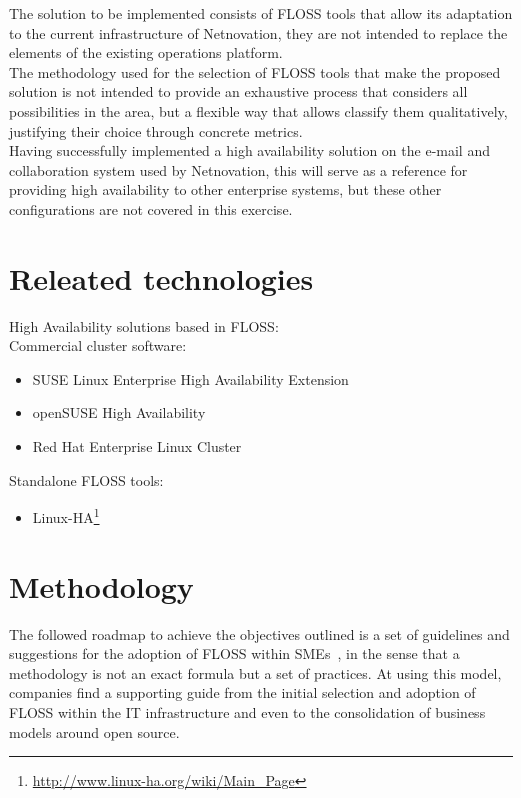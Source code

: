 \documentclass[a4paper, 12pt]{book}
\begin{document}
The solution to be implemented consists of FLOSS tools that allow its adaptation to the current infrastructure of Netnovation, they are not intended to replace the elements of the existing operations  platform.\\

\noindent The methodology used for the selection of FLOSS tools that make the proposed solution is not intended to provide an exhaustive process that considers all possibilities in the area, but a flexible way that allows classify them qualitatively, justifying their choice through concrete metrics.\\

\noindent Having successfully implemented a high availability solution on the e-mail and collaboration system used by Netnovation, this will serve as a reference for providing high availability to other enterprise systems, but these other configurations are not covered in this exercise.\\


%
\chapter{Releated technologies}
\label{chap:related}

High Availability solutions based in FLOSS:\\

\noindent Commercial cluster software:
\begin{itemize}
	\item SUSE Linux Enterprise High Availability Extension
	\item openSUSE High Availability
	\item Red Hat Enterprise Linux Cluster
\end{itemize}

\noindent Standalone FLOSS tools:
\begin{itemize}
	\item Linux-HA\footnote{\url{http://www.linux-ha.org/wiki/Main_Page}}
\end{itemize}


%
\chapter{Methodology}
\label{chap:methodology}

The followed roadmap to achieve the objectives outlined is a set of guidelines and suggestions for the adoption of FLOSS within SMEs~\cite{Daffara1}, in the sense that a methodology is not an exact formula but a set of practices. At using this model, companies find a supporting guide from the initial selection and adoption of FLOSS within the IT infrastructure and even to the consolidation of business models around open source.\\
\end{document}
